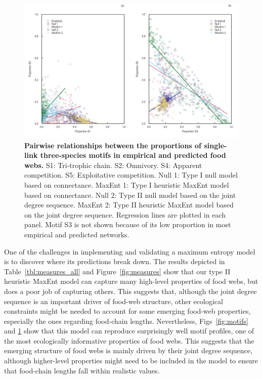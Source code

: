 \begin{figure}[!h]
  \centering
  \includegraphics[width=\textwidth]{figures/article2/motifs_relations.png}
  \caption{\textbf{Pairwise relationships between the proportions of single-link three-species motifs in empirical and predicted food webs.}
    S1: Tri-trophic chain. S2: Omnivory. S4: Apparent competition. S5:
    Exploitative competition. Null 1: Type I null model based on connectance.
    MaxEnt 1: Type I heuristic MaxEnt model based on connectance. Null 2: Type
    II null model based on the joint degree sequence. MaxEnt 2: Type II
    heuristic MaxEnt model based on the joint degree sequence. Regression lines
    are plotted in each panel. Motif S3 is not shown because of its low
    proportion in most empirical and predicted networks.}
  \label{fig:motifs_rel}
\end{figure}

\clearpage

One of the challenges in implementing and validating a maximum entropy model is
to discover where its predictions break down. The results depicted in
Table~\ref{tbl:measures_all} and Figure~\ref{fig:measures} show that our type II heuristic
MaxEnt model can capture many high-level properties of food webs, but does a
poor job of capturing others. This suggests that, although the joint degree
sequence is an important driver of food-web structure, other ecological
constraints might be needed to account for some emerging food-web properties,
especially the ones regarding food-chain lengths. Nevertheless,
Figs~\ref{fig:motifs} and \ref{fig:motifs_rel} show that this model can reproduce
surprisingly well motif profiles, one of the most ecologically informative
properties of food webs. This suggests that the emerging structure of food webs
is mainly driven by their joint degree sequence, although higher-level
properties might need to be included in the model to ensure that food-chain
lengths fall within realistic values. 


